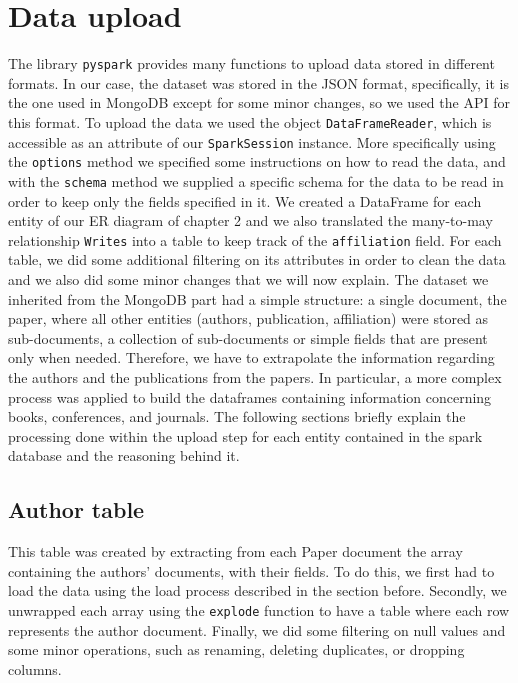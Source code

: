 \chapter{Data upload}
\label{ch:data_upload_spark}%
The library \verb|pyspark| provides many functions to upload data stored in different formats.
In our case, the dataset was stored in the JSON format, specifically, it is the one used in MongoDB except for some minor changes, so we used the API for this format.
To upload the data we used the object \verb|DataFrameReader|, which is accessible as an attribute of our \verb|SparkSession| instance.
More specifically using the \verb|options| method we specified some instructions on how to read the data, and with the \verb|schema| method we supplied a specific schema for the data to be read in order to keep only the fields specified in it.
We created a DataFrame for each entity of our ER diagram of chapter 2 and we also translated the many-to-may relationship \verb|Writes| into a table to keep track of the \verb|affiliation| field.
For each table, we did some additional filtering on its attributes in order to clean the data and we also did some minor changes that we will now explain.
The dataset we inherited from the MongoDB part had a simple structure: a single document, the paper, where all other entities (authors, publication, affiliation) were stored as sub-documents, a collection of sub-documents or simple fields that are present only when needed.
Therefore, we have to extrapolate the information regarding the authors and the publications from the papers.
In particular, a more complex process was applied to build the dataframes containing information concerning books, conferences, and journals.
The following sections briefly explain the processing done within the upload step for each entity contained in the spark database and the reasoning behind it.


\section{Author table}
\label{sec:author_table_spark}%
This table was created by extracting from each Paper document the array containing the authors' documents, with their fields.
To do this, we first had to load the data using the load process described in the section before.
Secondly, we unwrapped each array using the \verb|explode| function to have a table where each row represents the author document.
Finally, we did some filtering on null values and some minor operations, such as renaming, deleting duplicates, or dropping columns.


